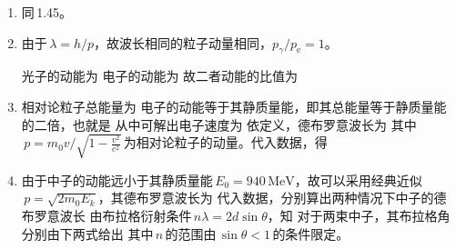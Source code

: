 \begin{enumerate}[label=1.\arabic*]
\item 同\,1.45。

\item
由于$\,\lambda=h/p$，故波长相同的粒子动量相同，$p_\gamma/p_{\mathrm{e}}=1$。\par
光子的动能为
电子的动能为
故二者动能的比值为

\item
相对论粒子总能量为
电子的动能等于其静质量能，即其总能量等于静质量能的二倍，也就是
从中可解出电子速度为
依定义，德布罗意波长为
其中$\,p=m_0v/\sqrt{1-\frac{v^2}{c^2}}\,$为相对论粒子的动量。代入数据，得

\item
由于中子的动能远小于其静质量能$\,E_0=940\,\mathrm{MeV}$，故可以采用经典近似$\,p=\sqrt{2m_0E_k}$，其德布罗意波长为
代入数据，分别算出两种情况下中子的德布罗意波长
由布拉格衍射条件$\,n\lambda=2d\sin\theta$，知
对于两束中子，其布拉格角分别由下两式给出
其中$\,n\,$的范围由$\,\sin\theta<1\,$的条件限定。


\end{enumerate}
